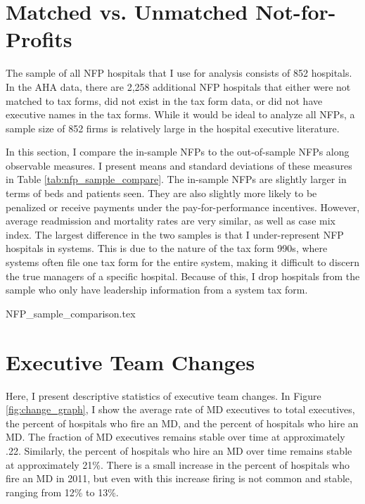 \documentclass[12pt]{article}
\begin{document}
\section{Matched vs. Unmatched Not-for-Profits}\label{app:matched}

The sample of all NFP hospitals that I use for analysis consists of 852 hospitals. In the AHA data, there are 2,258 additional NFP hospitals that either were not matched to tax forms, did not exist in the tax form data, or did not have executive names in the tax forms. While it would be ideal to analyze all NFPs, a sample size of 852 firms is relatively large in the hospital executive literature. 

In this section, I compare the in-sample NFPs to the out-of-sample NFPs along observable measures. I present means and standard deviations of these measures in Table \ref{tab:nfp_sample_compare}. The in-sample NFPs are slightly larger in terms of beds and patients seen. They are also slightly more likely to be penalized or receive payments under the pay-for-performance incentives. However, average readmission and mortality rates are very similar, as well as case mix index. The largest difference in the two samples is that I under-represent NFP hospitals in systems. This is due to the nature of the tax form 990s, where systems often file one tax form for the entire system, making it difficult to discern the true managers of a specific hospital. Because of this, I drop hospitals from the sample who only have leadership information from a system tax form. 

{NFP_sample_comparison.tex}


\section{Executive Team Changes}\label{app:changes}

Here, I present descriptive statistics of executive team changes. In Figure \ref{fig:change_graph}, I show the average rate of MD executives to total executives, the percent of hospitals who fire an MD, and the percent of hospitals who hire an MD. The fraction of MD executives remains stable over time at approximately .22. Similarly, the percent of hospitals who hire an MD over time remains stable at approximately 21\%. There is a small increase in the percent of hospitals who fire an MD in 2011, but even with this increase firing is not common and stable, ranging from 12\% to 13\%. 

\end{document}
